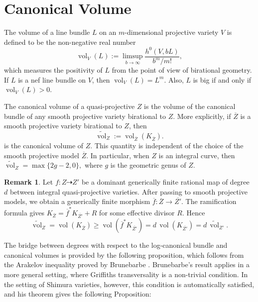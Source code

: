 \documentclass[12 pt]{amsart}
\theoremstyle{definition}
\newtheorem{Remark}[theorem]{Remark}
\begin{document}
\section{Canonical Volume}



The volume of a line bundle $L$ on an $m$-dimensional projective variety $V$ is defined to be the non-negative real number 
$$\operatorname{vol}_{V}(L):=\limsup\limits_{b\rightarrow \infty}\dfrac{h^0(V, bL)}{b^m/m!},$$
which measures the positivity of $L$ from the point of view of birational geometry. If $L$ is a nef line bundle on $V$, then $\operatorname{vol}_{V}(L)= L^{m}.$ Also, $L$ is big if and only if $\operatorname{vol}_{V}(L)>0.$

The canonical volume of a quasi-projective $Z$ is the volume of the canonical bundle of any smooth projective variety birational to $Z$. More explicitly, if $\overline{Z}$ is a smooth projective variety birational to $Z$, then
\[
\widetilde{\operatorname{vol}}_{Z}
:=
\operatorname{vol}_{\overline{Z}}(K_{\overline{Z}}).
\]
is the canonical volume of $Z$. This quantity is independent of the choice of the smooth projective model $\overline{Z}$. In particular, when $Z$ is an integral curve, then
\(
\widetilde{\operatorname{vol}}_{Z}=\max\{2g-2,0\},
\)
where $g$ is the geometric genus of $Z$. 
\begin{Remark}\label{volume-generically-finite}
Let \(f\colon Z\dashrightarrow Z'\) be a dominant generically finite rational map of degree \(d\) between integral quasi-projective varieties. After passing to smooth projective models, we obtain a generically finite morphism \(\overline f\colon\overline Z\to\overline{Z'}\). The ramification formula gives \(K_{\overline Z}=\overline f^{*}K_{\overline{Z'}}+R\)
for some effective divisor \(R\). Hence
\[
\widetilde{\operatorname{vol}}_{Z}=\operatorname{vol}(K_{\overline Z})\ge\operatorname{vol}(\overline f^{*}K_{\overline{Z'}})=d\,\operatorname{vol}(K_{\overline{Z'}})=d\,\widetilde{\operatorname{vol}}_{Z'}.\]
\end{Remark}

The bridge between degrees with respect to the log-canonical bundle and canonical volumes is provided by the following proposition, which follows from the Arakelov inequality proved by Brunebarbe \cite[Theorem 1.6]{brunebarbe2020increasing}. Brunebarbe's result applies in a more general setting, where Griffiths transversality is a non-trivial condition. In the setting of Shimura varieties, however, this condition is automatically satisfied, and his theorem gives the following Proposition:
\end{document}
